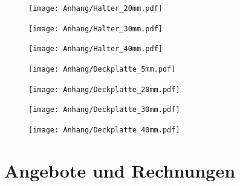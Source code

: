 \begin{figure}  
	\texttt{[image: Anhang/Halter\_20mm.pdf]}
\end{figure}

\begin{figure}  
	\texttt{[image: Anhang/Halter\_30mm.pdf]}
\end{figure}

\begin{figure}  
	\texttt{[image: Anhang/Halter\_40mm.pdf]}
\end{figure}

\begin{figure}  
	\texttt{[image: Anhang/Deckplatte\_5mm.pdf]}
\end{figure}

\begin{figure}  
	\texttt{[image: Anhang/Deckplatte\_20mm.pdf]}
\end{figure}

\begin{figure}  
	\texttt{[image: Anhang/Deckplatte\_30mm.pdf]}
\end{figure}

\begin{figure}  
	\texttt{[image: Anhang/Deckplatte\_40mm.pdf]}
\end{figure}

\clearpage


\section*{Angebote und Rechnungen}








